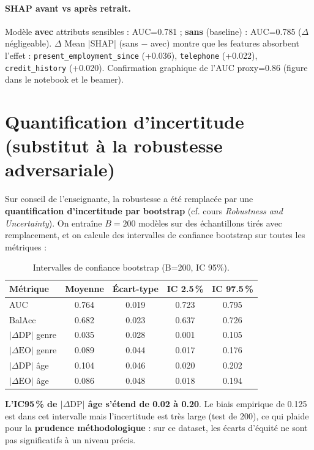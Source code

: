 \documentclass[11pt, a4paper]{article}
\begin{document}
\paragraph{SHAP avant vs apr\`es retrait.} Mod\`ele \textbf{avec} attributs sensibles : AUC=0.781 ; \textbf{sans} (baseline) : AUC=0.785 ($\Delta$ n\'egligeable). $\Delta$ Mean |SHAP| (sans $-$ avec) montre que les features absorbent l'effet : \texttt{present\_employment\_since} (+0.036), \texttt{telephone} (+0.022), \texttt{credit\_history} (+0.020). Confirmation graphique de l'AUC proxy=0.86 (figure dans le notebook et le beamer).

\section{Quantification d'incertitude (substitut \`a la robustesse adversariale)}

Sur conseil de l'enseignante, la robustesse a \'et\'e remplac\'ee par une \textbf{quantification d'incertitude par bootstrap} (cf. cours \textit{Robustness and Uncertainty}). On entra\^ine $B = 200$ mod\`eles sur des \'echantillons tir\'es avec remplacement, et on calcule des intervalles de confiance bootstrap sur toutes les m\'etriques :

\begin{table}[ht]
\centering
\small
\begin{tabular}{lcccc}
\toprule
\textbf{M\'etrique} & \textbf{Moyenne} & \textbf{\'Ecart-type} & \textbf{IC 2.5\,\%} & \textbf{IC 97.5\,\%} \\
\midrule
AUC          & 0.764 & 0.019 & 0.723 & 0.795 \\
BalAcc       & 0.682 & 0.023 & 0.637 & 0.726 \\
$|\Delta\text{DP}|$ genre & 0.035 & 0.028 & 0.001 & 0.105 \\
$|\Delta\text{EO}|$ genre & 0.089 & 0.044 & 0.017 & 0.176 \\
$|\Delta\text{DP}|$ \^age  & 0.104 & 0.046 & 0.020 & 0.202 \\
$|\Delta\text{EO}|$ \^age  & 0.086 & 0.048 & 0.018 & 0.194 \\
\bottomrule
\end{tabular}
\caption{Intervalles de confiance bootstrap (B=200, IC 95\%).}
\end{table}

\textbf{L'IC95\,\% de $|\Delta\text{DP}|$ \^age s'\'etend de 0.02 \`a 0.20}. Le biais empirique de 0.125 est dans cet intervalle mais l'incertitude est tr\`es large (test de 200), ce qui plaide pour la \textbf{prudence m\'ethodologique} : sur ce dataset, les \'ecarts d'\'equit\'e ne sont pas significatifs \`a un niveau pr\'ecis.
\end{document}
